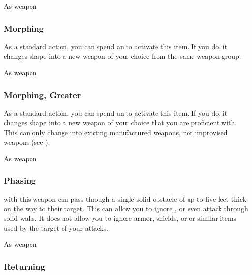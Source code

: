  As weapon


\lowercase{\hypertarget{item:Morphing}{}}\label{item:Morphing}
\hypertarget{item:Morphing}{\subsubsection{Morphing\hfill{}}}

As a standard action, you can spend an  to activate this item.
If you do, it changes shape into a new weapon of your choice from the same weapon group.



 


 As weapon


\lowercase{\hypertarget{item:Morphing, Greater}{}}\label{item:Morphing, Greater}
\hypertarget{item:Morphing, Greater}{\subsubsection{Morphing, Greater\hfill{}}}

As a standard action, you can spend an  to activate this item.
If you do, it changes shape into a new weapon of your choice that you are proficient with.
This can only change into existing manufactured weapons, not improvised weapons (see ).



 


 As weapon


\lowercase{\hypertarget{item:Phasing}{}}\label{item:Phasing}
\hypertarget{item:Phasing}{\subsubsection{Phasing\hfill{}}}

 with this weapon can pass through a single solid obstacle of up to five feet thick on the way to their target.
This can allow you to ignore , or even attack through solid walls.
It does not allow you to ignore armor, shields, or or similar items used by the target of your attacks.



 


 As weapon


\lowercase{\hypertarget{item:Returning}{}}\label{item:Returning}
\hypertarget{item:Returning}{\subsubsection{Returning\hfill{}}}

